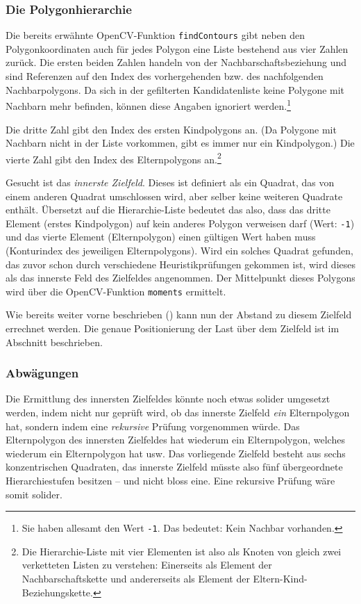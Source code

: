 \subsubsection{Die Polygonhierarchie}

Die bereits erwähnte OpenCV-Funktion \texttt{findContours} gibt neben den Polygonkoordinaten auch für jedes Polygon eine Liste bestehend aus vier Zahlen zurück. Die ersten beiden Zahlen handeln von der Nachbarschaftsbeziehung und sind Referenzen auf den Index des vorhergehenden bzw. des nachfolgenden Nachbarpolygons. Da sich in der gefilterten Kandidatenliste keine Polygone mit Nachbarn mehr befinden, können diese Angaben ignoriert werden.\footnote{Sie haben allesamt den Wert \texttt{-1}. Das bedeutet: Kein Nachbar vorhanden.}

Die dritte Zahl gibt den Index des ersten Kindpolygons an. (Da Polygone mit Nachbarn nicht in der Liste vorkommen, gibt es immer nur ein Kindpolygon.) Die vierte Zahl gibt den Index des Elternpolygons an.\footnote{Die Hierarchie-Liste mit vier Elementen ist also als Knoten von gleich zwei verketteten Listen zu verstehen: Einerseits als Element der Nachbarschaftskette und andererseits als Element der Eltern-Kind-Beziehungskette.}

Gesucht ist das \textit{innerste Zielfeld}. Dieses ist definiert als ein Quadrat, das von einem anderen Quadrat umschlossen wird, aber selber keine weiteren Quadrate enthält. Übersetzt auf die Hierarchie-Liste bedeutet das also, dass das dritte Element (erstes Kindpolygon) auf kein anderes Polygon verweisen darf (Wert: \texttt{-1}) und das vierte Element (Elternpolygon) einen gültigen Wert haben muss (Konturindex des jeweiligen Elternpolygons). Wird ein solches Quadrat gefunden, das zuvor schon durch verschiedene Heuristikprüfungen gekommen ist, wird dieses als das innerste Feld des Zielfeldes angenommen. Der Mittelpunkt dieses Polygons wird über die OpenCV-Funktion \texttt{moments} ermittelt.

Wie bereits weiter vorne beschrieben () kann nun der Abstand zu diesem Zielfeld errechnet werden. Die genaue Positionierung der Last über dem Zielfeld ist im Abschnitt  beschrieben.

\subsubsection{Abwägungen}

Die Ermittlung des innersten Zielfeldes könnte noch etwas solider umgesetzt werden, indem nicht nur geprüft wird, ob das innerste Zielfeld \textit{ein} Elternpolygon hat, sondern indem eine \textit{rekursive} Prüfung vorgenommen würde. Das Elternpolygon des innersten Zielfeldes hat wiederum ein Elternpolygon, welches wiederum ein Elternpolygon hat usw. Das vorliegende Zielfeld besteht aus sechs konzentrischen Quadraten, das innerste Zielfeld müsste also fünf übergeordnete Hierarchiestufen besitzen -- und nicht bloss eine. Eine rekursive Prüfung wäre somit solider.

